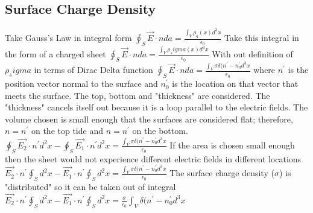 \documentclass[12pt]{article}
\begin{document}
\subsection{Surface Charge Density}
Take Gauss's Law in integral form
\newline $\oint_S \vec{E} \cdot n da = \frac{\int_V \rho_q(x) d^3 x}{\epsilon_0}$
\newline Take this integral in the form of a charged sheet
\newline $\oint_S \vec{E} \cdot n da = \frac{\int_V \rho_sigma(x) d^3 x}{\epsilon_0}$
\newline With out definition of $\rho_sigma$ in terms of Dirac Delta function
\newline $\oint_S \vec{E} \cdot n da = \frac{\int_V \sigma \delta (n^{'}-n_0^{'} d^3 x}{\epsilon_0}$
\newline where $n^{'}$ is the position vector normal to the surface and $n_0^{'}$ is the location on that vector that meets the surface. 
\newline The top, bottom and "thickness" are considered. The "thickness" cancels itself out because it is a loop parallel to the electric fields. The volume chosen is small enough that the surfaces are considered flat; therefore, $n=n^{'}$ on the top tide and $n=n^{'}$ on the bottom. 
\newline $\oint_S \vec{E_2} \cdot n^{'} d^2 x - \oint_S \vec{E_1} \cdot n^{'} d^2x= \frac{\int_V \sigma \delta (n^{'}-n_0^{'} d^3 x}{\epsilon_0}$
\newline If the area is chosen small enough then the sheet would not experience different electric fields in different locations
\newline $\vec{E_2} \cdot n^{'} \oint_S d^2x - \vec{E_1} \cdot n^{'} \oint_S d^2x = \frac{\int_V \sigma \delta (n^{'}-n_0^{'} d^3 x}
{\epsilon_0}$
\newline The surface charge density ($\sigma$) is "distributed" so it can be taken out of integral
\newline $\vec{E_2} \cdot n^{'} \oint_S d^2x - \vec{E_1} \cdot n^{'} \oint_S d^2x = \frac{\sigma}{\epsilon_0} \int_V \delta (n^{'}-n_0^{'} d^3x$
\end{document}
